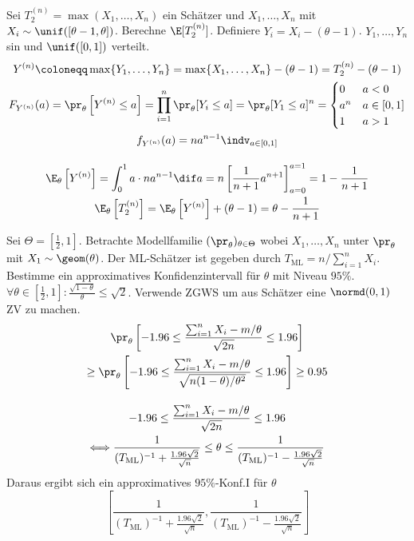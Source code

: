 \begin{example}
	Sei $T_2^{(n)} = \max (X_{1}, \ldots, X_{n})$ ein Schätzer und $X_{1}, \ldots, X_{n}$ \iid mit $X_i \sim \unif
	([\theta - 1, \theta])$. Berechne $\E [T_2^{(n)}]$.
	\tcblower
	Definiere $Y_i = X_i -(\theta - 1)$. $Y_{1}, \ldots, Y_{n}$ sin \iid und $\unif([0,1])$ verteilt.
	\begin{gather*}
		Y^{(n)} \coloneqq \max \{Y_1 , \ldots , Y_n\} = \max \{X_{1}, \ldots, X_{n}\} - (\theta - 1 ) = T_2^{(n)} -
		(\theta - 1)\\
		F_{Y^{(n)}}(a) = \pr_\theta \left[ Y^{(n)} \leq a \right] = \prod_{i=1}^n \pr_\theta [Y_i \leq a] = \pr_\theta
		[Y_1 \leq a]^n = 
		\begin{cases}
			0 & a < 0\\
			a^n & a \in [0,1]\\
			1 & a > 1
		\end{cases}\\
		f_{Y^{(n)}}(a) = na^{n - 1} \indv_{a \in [0,1]}\\[10pt]
		\E_\theta \left[ Y^{(n)} \right] = \int_{0}^{1} a \cdot na^{n-1} \dif a = n \left[ \frac{1}{n+1} a^{n+1}
		\right]_{a=0}^{a=1} = 1 - \frac{1}{n+1} \\
		\E_\theta \left[ T_2^{(n)} \right] = \E_\theta \left[ Y^{(n)} \right] + (\theta - 1) = \theta - \frac{1}{n+1} 
	\end{gather*}
\end{example}
\begin{example}
	Sei $\Theta = [\frac{1}{2} ,1]$. Betrachte Modellfamilie $(\pr_\theta)_{\theta \in \Theta}$ wobei $X_{1}, \ldots,
	X_{n}$ unter $\pr_\theta$ \iid mit $X_1 \sim \geom(\theta)$. Der ML-Schätzer ist gegeben durch $T_{\text{ML}} = n/
	\sum_{i=1}^{n} X_i$.\\
	Bestimme ein approximatives Konfidenzintervall für $\theta$ mit Niveau $95\%$.\\
	$\forall \theta \in [\frac{1}{2} ,1]: \frac{\sqrt{1-\theta}}{\theta}  \leq \sqrt{2}$.
	\tcblower
	Verwende ZGWS um aus Schätzer eine $\normd(0,1)$ ZV zu machen.
	\begin{gather*}
		\pr_\theta \left[ -1.96 \leq \frac{\sum_{i=1}^{n} X_i - m/\theta}{\sqrt{2n}} \leq 1.96  \right] \\ 
		\geq \pr_\theta \left[ -1.96 \leq \frac{\sum_{i=1}^{n} X_i - m/\theta}{\sqrt{n(1-\theta) / \theta^2}} \leq 1.96  \right]
		\geq 0.95\\[10pt]
		-1.96 \leq \frac{\sum_{i=1}^{n} X_i - m/\theta}{\sqrt{2n}} \leq 1.96\\
		\Longleftrightarrow
		\frac{1}{(T_{\text{ML}})^{-1} + \frac{1.96 \sqrt{2}}{\sqrt{n}}} \leq \theta \leq \frac{1}{(T_{\text{ML}})^{-1} - \frac{1.96 \sqrt{2}}{\sqrt{n}}}
	\end{gather*}
	Daraus ergibt sich ein approximatives $95\%$-Konf.I für $\theta$
	\begin{equation*}
		\left[ \frac{1}{(T_{\text{ML}})^{-1} + \frac{1.96 \sqrt{2}}{\sqrt{n}}}, \frac{1}{(T_{\text{ML}})^{-1} - \frac{1.96 \sqrt{2}}{\sqrt{n}}} \right]
	\end{equation*}
\end{example}
